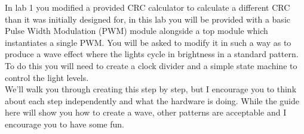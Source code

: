 In lab 1 you modified a provided CRC calculator to calculate a different CRC than it was initially designed for, in this lab you will be provided with a basic Pulse Width Modulation (PWM) module alongside a top module which instantiates a single PWM. You will be asked to modify it in such a way as to produce a wave effect where the lights cycle in brightness in a standard pattern. To do this you will need to create a clock divider and a simple state machine to control the light levels.\\
\vspace{0.5cm}
We'll walk you through creating this step by step, but I encourage you to think about each step independently and what the hardware is doing. While the guide here will show you how to create a wave, other patterns are acceptable and I encourage you to have some fun.